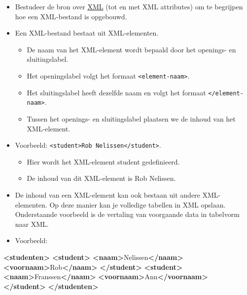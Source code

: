 \documentclass[]{tufte-book}
\newenvironment{Shaded}{}{}
\newcommand{\KeywordTok}[1]{\textcolor[rgb]{0.00,0.44,0.13}{\textbf{#1}}}
\newcommand{\NormalTok}[1]{#1}
\providecommand{\tightlist}{%
  \setlength{\itemsep}{0pt}\setlength{\parskip}{0pt}}
\begin{document}
\begin{itemize}
\tightlist
\item
  Bestudeer de bron over \href{https://www.w3schools.com/xml/default.asp}{XML} (tot en met XML attributes) om te begrijpen hoe een XML-bestand is opgebouwd.
\item
  Een XML-bestand bestaat uit XML-elementen.

  \begin{itemize}
  \tightlist
  \item
    De naam van het XML-element wordt bepaald door het openings- en sluitingslabel.
  \item
    Het openingslabel volgt het formaat \texttt{\textless{}element-naam\textgreater{}}.
  \item
    Het sluitingslabel heeft dezelfde naam en volgt het formaat \texttt{\textless{}/element-naam\textgreater{}}.
  \item
    Tussen het openings- en sluitingslabel plaatsen we de inhoud van het XML-element.
  \end{itemize}
\item
  Voorbeeld: \texttt{\textless{}student\textgreater{}Rob\ Nelissen\textless{}/student\textgreater{}}.

  \begin{itemize}
  \tightlist
  \item
    Hier wordt het XML-element student gedefinieerd.
  \item
    De inhoud van dit XML-element is Rob Nelissen.
  \end{itemize}
\item
  De inhoud van een XML-element kan ook bestaan uit andere XML-elementen. Op deze manier kan je volledige tabellen in XML opslaan. Onderstaande voorbeeld is de vertaling van voorgaande data in tabelvorm naar XML.
\item
  Voorbeeld:
\end{itemize}

\begin{Shaded}
\begin{Highlighting}[]
\KeywordTok{<studenten>}
  \KeywordTok{<student>}
    \KeywordTok{<naam>}\NormalTok{Nelissen}\KeywordTok{</naam>}
    \KeywordTok{<voornaam>}\NormalTok{Rob}\KeywordTok{</naam>}
  \KeywordTok{</student>}
  \KeywordTok{<student>}
    \KeywordTok{<naam>}\NormalTok{Franssen}\KeywordTok{</naam>}
    \KeywordTok{<voornaam>}\NormalTok{Ann}\KeywordTok{</voornaam>}
  \KeywordTok{</student>}
\KeywordTok{</studenten>}
\end{Highlighting}
\end{Shaded}
\end{document}
